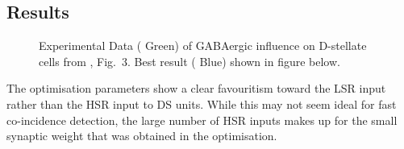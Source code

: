 
\clearpage
\subsection{Results}


\begin{figure}[htb!]
  \centering
\caption{Experimental Data ({\color{green} Green}) of GABAergic influence on D-stellate cells from \citep{BackoffPalombiEtAl:1997}, Fig.~3.  Best result ({\color{blue} Blue}) shown in figure below.} \label{fig:DS_ClickRecovery_result}  
\end{figure}

The optimisation parameters show a clear favouritism toward the LSR input rather than the HSR input to DS units. While this may not seem ideal for fast co-incidence detection, the large number of HSR inputs makes up for the small synaptic weight that was obtained in the optimisation.








